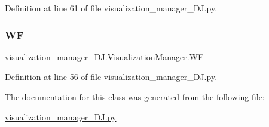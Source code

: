 Definition at line 61 of file visualization\+\_\+manager\+\_\+\+D\+J.\+py.

\mbox{\label{classvisualization__manager___d_j_1_1_visualization_manager_a56add1b450c7ecd758b096117f593578}} 
\subsubsection{\texorpdfstring{WF}{WF}}
{\footnotesize\ttfamily visualization\+\_\+manager\+\_\+\+D\+J.\+Visualization\+Manager.\+WF}



Definition at line 56 of file visualization\+\_\+manager\+\_\+\+D\+J.\+py.



The documentation for this class was generated from the following file\+:\begin{DoxyCompactItemize}
\item 
\mbox{\hyperlink{visualization__manager___d_j_8py}{visualization\+\_\+manager\+\_\+\+D\+J.\+py}}\end{DoxyCompactItemize}
